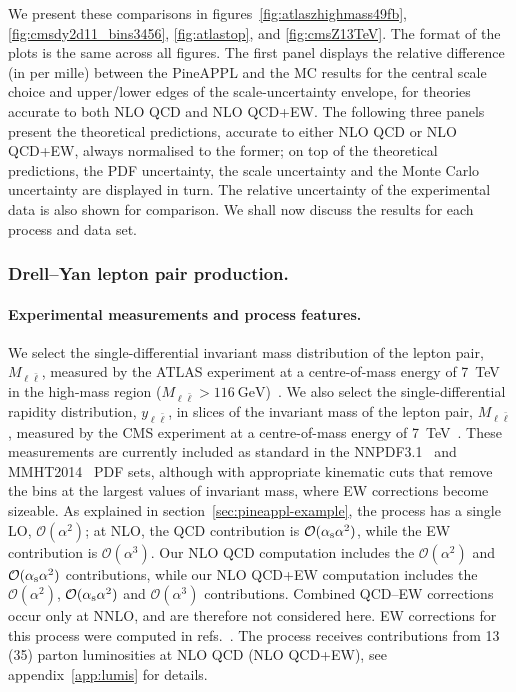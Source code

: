 We present these comparisons in
figures~\ref{fig:atlaszhighmass49fb}, \ref{fig:cmsdy2d11_bins3456}, \ref{fig:atlastop}, and \ref{fig:cmsZ13TeV}.
The format of the plots is the same across all figures. The first panel
displays the relative difference (in per mille) between the {\sc PineAPPL} and
the MC results for the central scale choice and upper/lower edges of the
scale-uncertainty envelope, for
theories accurate to both NLO QCD and NLO QCD+EW. The following three panels
present the theoretical predictions, accurate to either NLO QCD or NLO QCD+EW,
always normalised to the former; on top of the theoretical predictions, the
PDF uncertainty, the scale uncertainty and the Monte Carlo uncertainty are
displayed in turn. The relative uncertainty of the experimental data is
also shown for comparison. We shall now discuss the results for each
process and data set.

\subsubsection{Drell--Yan lepton pair production.}
\label{sec:dy-lepton-pair-production}

\paragraph{Experimental measurements and process features.}
We select the single-differential invariant mass distribution of the
lepton pair, $M_{\ell \bar\ell}$, measured by the ATLAS experiment at a centre-of-mass
energy of \SI{7}{\tera\electronvolt} in the high-mass region
($M_{\ell\bar\ell}>\SI{116}{\giga\electronvolt}$)~\cite{Aad:2013iua}.
We also select the single-differential rapidity distribution, $y_{\ell\bar\ell}$, in slices of
the invariant mass of the lepton pair, $M_{\ell\bar\ell}$,
measured by the CMS experiment at a centre-of-mass energy of
\SI{7}{\tera\electronvolt}~\cite{Chatrchyan:2013tia}.
These measurements are currently included as standard in the
NNPDF3.1~\cite{Ball:2017nwa} and MMHT2014~\cite{Harland-Lang:2014zoa} PDF sets,
although with appropriate kinematic cuts that remove the bins at the largest
values of invariant mass, where EW corrections become sizeable. As explained in
section~\ref{sec:pineappl-example}, 
the process has a single LO, $\mathcal{O}(\alpha^2)$; at NLO, the
QCD contribution is $\mathcal{O}(\alpha_\mathrm{s}\alpha^2)$, while the EW contribution
is $\mathcal{O}(\alpha^3)$. Our NLO QCD computation includes the
$\mathcal{O}(\alpha^2)$ and $\mathcal{O}(\alpha_\mathrm{s}\alpha^2)$ contributions, while
our NLO QCD+EW computation includes the $\mathcal{O}(\alpha^2)$, 
$\mathcal{O}(\alpha_\mathrm{s}\alpha^2)$ and $\mathcal{O}(\alpha^3)$ contributions.
Combined QCD--EW corrections occur only at NNLO, and are therefore not
considered here. EW corrections for this process were computed in
refs.~\cite{Baur:2001ze,Dittmaier:2009cr}. The process receives contributions
from 13 (35) parton luminosities at NLO QCD (NLO QCD+EW),
see appendix~\ref{app:lumis} for details.


